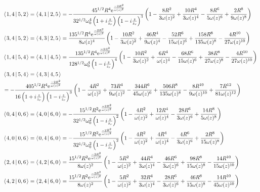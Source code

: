 \documentclass[11pt]{amsart}
\makeatletter
\newcommand{\e}{{\rm e}}				%
\newcommand{\msp}[1]{\mspace{#1mu}}		%
\newcommand{\0}{\varnothing}		%
\newcommand{\brac}[2]{\left\langle\msp{2} #1\left\lvert \msp{3.5} #2 \right.\right\rangle}	%
\newcommand{\1}{!}
\newcommand{\2}{@}
\newcommand{\3}{\#}
\newcommand{\4}{\$}
\newcommand{\5}{\%}
\newcommand{\6}{$^\wedge$}
\newcommand{\7}{\&}
\newcommand{\8}{*}
\newcommand{\9}{(}
\makeatother
\begin{document}
 \begin{align*}
 &
 \brac{1,4}{5,2} = \brac{4,1}{2,5} = -\frac{45^{1/2}R^4\e^{\frac{-2R^2}{\omega(z)^2}}}{32^{1/2}\omega_0^4\left(1+i\frac{z}{z_r}\right)\left(1-i\frac{z}{z_r}\right)^3}\left(1-\frac{8R^2}{3\omega(z)^2}+\frac{10R^4}{3\omega(z)^4}-\frac{8R^6}{5\omega(z)^6}+\frac{2R^8}{9\omega(z)^8}\right)
 \\
 &
 \brac{3,4}{5,2} = \brac{4,3}{2,5} = \frac{135^{1/2}R^4\e^{\frac{-2R^2}{\omega(z)^2}}}{8\omega(z)^4}\left(1-\frac{10R^2}{3\omega(z)^2}+\frac{46R^4}{9\omega(z)^4}-\frac{52R^6}{15\omega(z)^6}+\frac{158R^8}{135\omega(z)^8}-\frac{4R^{10}}{27\omega(z)^{10}}\right)
 \\
 &
 \brac{1,4}{5,4} = \brac{4,1}{4,5}=\frac{135^{1/2}R^4\e^{\frac{-2R^2}{\omega(z)^2}}}{128^{1/2}\omega_0^4\left(1-i\frac{z}{z_r}\right)^4}\left(1-\frac{10R^2}{3\omega(z)^2}+\frac{6R^4}{\omega(z)^4}-\frac{68R^6}{15\omega(z)^6}+\frac{38R^8}{27\omega(z)^8}-\frac{4R^{10}}{27\omega(z)^{10}}\right)
 \\
 &
 \brac{3,4}{5,4} = \brac{4,3}{4,5} 
 \\
 &
 = -\frac{405^{1/2}R^4\e^{\frac{-2R^2}{\omega(z)^2}}}{16\left(1+i\frac{z}{z_r}\right)\left(1-i\frac{z}{z_r}\right)^3}\left(1-\frac{4R^2}{\omega(z)^2}+\frac{73R^4}{9\omega(z)^2}-\frac{344R^6}{45\omega(z)^6}+\frac{506R^8}{135\omega(z)^8}-\frac{8R^{10}}{9\omega(z)^{10}}+\frac{7R^{12}}{81\omega(z)^{12}}\right)
 \\
 &
 \brac{0,4}{0,6} = \brac{4,0}{6,0} =-\frac{15^{1/2}R^2\e^{\frac{-2R^2}{\omega(z)^2}}}{32^{1/2}\omega_0^2\left(1-i\frac{z}{z_r}\right)^2}\left(1-\frac{4R^2}{\omega(z)^2}+\frac{12R^4}{\omega(z)^4}-\frac{28R^6}{3\omega(z)^6}+\frac{14R^8}{5\omega(z)^8}\right)
 \\
 &
 \brac{4,0}{0,6} = \brac{0,4}{6,0} =-\frac{15^{1/2}R^2\e^{\frac{-2R^2}{\omega(z)^2}}}{32^{1/2}\omega_0^2\left(1-i\frac{z}{z_r}\right)^2}\left(1-\frac{4R^2}{\omega(z)^2}+\frac{4R^4}{\omega(z)^4}-\frac{4R^6}{3\omega(z)^6}+\frac{2R^8}{15\omega(z)^8}\right)
 \\
 &
 \brac{2,4}{0,6} = \brac{4,2}{6,0} = \frac{15^{1/2}R^2\e^{\frac{-2R^2}{\omega(z)^2}}}{8\omega(z)^2}\left(1-\frac{5R^2}{\omega(z)^2}+\frac{44R^4}{3\omega(z)^4}-\frac{46R^6}{3\omega(z)^6}+\frac{98R^8}{15\omega(z)^8} - \frac{14R^{10}}{15\omega(z)^{10}}\right)
 \\
 &
 \brac{4,2}{0,6} = \brac{2,4}{6,0} = \frac{15^{1/2}R^2\e^{\frac{-2R^2}{\omega(z)^2}}}{8\omega(z)^2}\left(1-\frac{5R^2}{\omega(z)^2}+\frac{32R^4}{3\omega(z)^4}-\frac{28R^6}{3\omega(z)^6}+\frac{46R^8}{15\omega(z)^8}-\frac{14R^{10}}{45\omega(z)^{10}}\right)

\end{align*}
\end{document}
